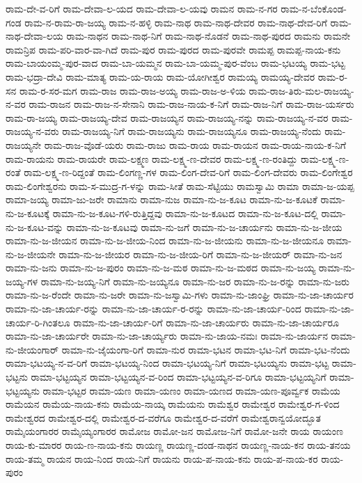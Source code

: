 ರಾಮ-ದೇ-ವ-ರಿಗೆ
ರಾಮ-ದೇವಾ-ಲ-ಯದ
ರಾಮ-ದೇವಾ-ಲ-ಯವು
ರಾಮನ
ರಾಮ-ನ-ಗರ
ರಾಮ-ನ-ಬೆಂಕೊಂಡ-ಗಂಡ
ರಾಮ-ನ-ರಾಮ-ರಾ-ಜಯ್ಯ
ರಾಮ-ನ-ಹಳ್ಳಿ
ರಾಮ-ನಾಥ
ರಾಮ-ನಾಥ-ದೇವರ
ರಾಮ-ನಾಥ-ದೇವ-ರಿಗೆ
ರಾಮ-ನಾಥ-ದೇವಾ-ಲಯ
ರಾಮ-ನಾಥನ
ರಾಮ-ನಾಥ-ನಿಗೆ
ರಾಮ-ನಾಥ-ನೊಡನೆ
ರಾಮ-ನಾಥ-ಪುರದ
ರಾಮನು
ರಾಮನೇ
ರಾಮನ್ರಿಪ
ರಾಮ-ಪರಿ-ವಾರ-ವಾ-ಗಿದೆ
ರಾಮ-ಪುರ
ರಾಮ-ಪುರದ
ರಾಮ-ಪುರವೇ
ರಾಮಪ್ಪ
ರಾಮಪ್ಪ-ನಾಯ-ಕನು
ರಾಮ-ಬಾಯಂಮ್ಮ-ಪುರ-ವಾದ
ರಾಮ-ಬಾ-ಯಮ್ಮನ
ರಾಮ-ಬಾ-ಯಮ್ಮ-ಪುರ-ವೆಂಬ
ರಾಮ-ಭಟಯ್ಯ
ರಾಮ-ಭಟ್ಟ
ರಾಮ-ಭದ್ರಾ-ದೇವಿ
ರಾಮ-ಮಾತ್ಯ
ರಾಮ-ಯ-ರಾಯ
ರಾಮ-ಯೋಗೀಶ್ವರ
ರಾಮಯ್ಯ
ರಾಮಯ್ಯ-ದೇವರ
ರಾಮ-ರ-ಸನ
ರಾಮ-ರ-ಸರ-ಮಗ
ರಾಮ-ರಾಜ
ರಾಮ-ರಾಜ-ಅಯ್ಯ
ರಾಮ-ರಾಜ-ಅ-ಳಿಯ
ರಾಮ-ರಾಜ-ತಿರು-ಮಲ-ರಾಜಯ್ಯ-ನ-ವರ
ರಾಮ-ರಾಜನ
ರಾಮ-ರಾಜ-ನ-ಸೇನಾನಿ
ರಾಮ-ರಾಜ-ನಾಯ-ಕ-ನಿಗೆ
ರಾಮ-ರಾಜ-ನಿಗೆ
ರಾಮ-ರಾಜ-ಯರ್ಸರು
ರಾಮ-ರಾ-ಜಯ್ಯ
ರಾಮ-ರಾಜಯ್ಯ-ದೇವ
ರಾಮ-ರಾಜಯ್ಯನ
ರಾಮ-ರಾಜಯ್ಯ-ನನ್ನು
ರಾಮ-ರಾಜಯ್ಯ-ನ-ವರ
ರಾಮ-ರಾಜಯ್ಯ-ನ-ವರು
ರಾಮ-ರಾಜಯ್ಯ-ನಿಗೆ
ರಾಮ-ರಾಜಯ್ಯನು
ರಾಮ-ರಾಜಯ್ಯನೂ
ರಾಮ-ರಾಜಯ್ಯ-ನೆಂದು
ರಾಮ-ರಾಜಯ್ಯನೇ
ರಾಮ-ರಾಜ-ವೊಡೆ-ಯರು
ರಾಮ-ರಾಜು
ರಾಮ-ರಾಯ
ರಾಮ-ರಾಯನ
ರಾಮ-ರಾಯ-ನಾಯ-ಕ-ನಿಗೆ
ರಾಮ-ರಾಯನು
ರಾಮ-ರಾಯರೇ
ರಾಮ-ಲಕ್ಷ್ಮಣ
ರಾಮ-ಲಕ್ಷ್ಮ-ಣ-ದೇವರ
ರಾಮ-ಲಕ್ಷ್ಮ-ಣ-ರಂತಿದ್ದು
ರಾಮ-ಲಕ್ಷ್ಮ-ಣ-ರಂತೆ
ರಾಮ-ಲಕ್ಷ್ಮ-ಣ-ರಿದ್ದಂತೆ
ರಾಮ-ಲಿಂಗಣ್ಣ-ಗಳ
ರಾಮ-ಲಿಂಗ-ದೇವ-ರಿಗೆ
ರಾಮ-ಲಿಂಗ-ದೇವರು
ರಾಮ-ಲಿಂಗೇಶ್ವರ
ರಾಮ-ಲಿಂಗೇಶ್ವರನು
ರಾಮ-ಸ-ಮುದ್ರ-ಗ-ಳನ್ನು
ರಾಮ-ಸೀತೆ
ರಾಮ-ಸೆಟ್ಟಿಯು
ರಾಮಸ್ವಾಮಿ
ರಾಮಾ
ರಾಮಾ-ಜ-ಯಪ್ಪ
ರಾಮಾ-ಜಯ್ಯ
ರಾಮಾ-ಜು-ಜರೇ
ರಾಮಾನು
ರಾಮಾ-ನುಜ
ರಾಮಾ-ನು-ಜ-ಕೂಟ
ರಾಮಾ-ನು-ಜ-ಕೂಟಕೆ
ರಾಮಾ-ನು-ಜ-ಕೂಟಕ್ಕೆ
ರಾಮಾ-ನು-ಜ-ಕೂಟ-ಗಳಿ-ರುತ್ತಿದ್ದವು
ರಾಮಾ-ನು-ಜ-ಕೂಟದ
ರಾಮಾ-ನು-ಜ-ಕೂಟ-ದಲ್ಲಿ
ರಾಮಾ-ನು-ಜ-ಕೂಟ-ವನ್ನು
ರಾಮಾ-ನು-ಜ-ಕೂಟವು
ರಾಮಾ-ನು-ಜಗೆ
ರಾಮಾ-ನು-ಜ-ಚಾರ್ಯನು
ರಾಮಾ-ನು-ಜ-ಜೀಯ
ರಾಮಾ-ನು-ಜ-ಜೀಯನ
ರಾಮಾ-ನು-ಜ-ಜೀಯ-ನಿಂದ
ರಾಮಾ-ನು-ಜ-ಜೀಯನು
ರಾಮಾ-ನು-ಜ-ಜೀಯನೂ
ರಾಮಾ-ನು-ಜ-ಜೀಯನೇ
ರಾಮಾ-ನು-ಜ-ಜೀಯರ
ರಾಮಾ-ನು-ಜ-ಜೀಯ-ರಿಗೆ
ರಾಮಾ-ನು-ಜ-ಜೀಯರ್
ರಾಮಾ-ನು-ಜನ
ರಾಮಾ-ನು-ಜನು
ರಾಮಾ-ನು-ಜ-ಪುರಂ
ರಾಮಾ-ನು-ಜ-ಮಠ
ರಾಮಾ-ನು-ಜ-ಮಠದ
ರಾಮಾ-ನು-ಜಯ್ಯ
ರಾಮಾ-ನು-ಜಯ್ಯ-ಗಳ
ರಾಮಾ-ನು-ಜಯ್ಯ-ನಿಗೆ
ರಾಮಾ-ನು-ಜಯ್ಯನೂ
ರಾಮಾ-ನು-ಜರ
ರಾಮಾ-ನು-ಜ-ರನ್ನು
ರಾಮಾ-ನು-ಜರು
ರಾಮಾ-ನು-ಜ-ರೆಂದೇ
ರಾಮಾ-ನು-ಜರೇ
ರಾಮಾ-ನು-ಜಸ್ವಾಮಿ-ಗಳು
ರಾಮಾ-ನು-ಜಾಂಘ್ರಿ
ರಾಮಾ-ನು-ಜಾ-ಚಾರ್ಯರ
ರಾಮಾ-ನು-ಜಾ-ಚಾರ್ಯ-ರನ್ನು
ರಾಮಾ-ನು-ಜಾ-ಚಾರ್ಯ-ರ-ರನ್ನು
ರಾಮಾ-ನು-ಜಾ-ಚಾರ್ಯ-ರಿಂದ
ರಾಮಾ-ನು-ಜಾ-ಚಾರ್ಯ-ರಿ-ಗಿಂತಲೂ
ರಾಮಾ-ನು-ಜಾ-ಚಾರ್ಯ-ರಿಗೆ
ರಾಮಾ-ನು-ಜಾ-ಚಾರ್ಯರು
ರಾಮಾ-ನು-ಜಾ-ಚಾರ್ಯರೂ
ರಾಮಾ-ನು-ಜಾ-ಚಾರ್ಯರೇ
ರಾಮಾ-ನು-ಜಾ-ಚಾರ್ಯ್ಯರು
ರಾಮಾ-ನು-ಜಾಯ-ನಮಃ
ರಾಮಾ-ನು-ಜಾರ್ಯನ
ರಾಮಾ-ನು-ಜೀಯಂಗಾರ್
ರಾಮಾ-ನು-ಜೈಯಂಗಾ-ರಿಗೆ
ರಾಮಾ-ನುರ
ರಾಮಾ-ಭಟನ
ರಾಮಾ-ಭಟ-ನಿಗೆ
ರಾಮಾ-ಭಟ-ನೆಂದು
ರಾಮಾ-ಭಟಯ್ಯ-ನ-ವ-ರಿಗೆ
ರಾಮಾ-ಭಟಯ್ಯ-ನಿಂದ
ರಾಮಾ-ಭಟಯ್ಯ-ನಿಗೆ
ರಾಮಾ-ಭಟಯ್ಯನು
ರಾಮಾ-ಭಟ್ಟ
ರಾಮಾ-ಭಟ್ಟನು
ರಾಮಾ-ಭಟ್ಟಯ್ಯನ
ರಾಮಾ-ಭಟ್ಟಯ್ಯನ-ವ-ರಿಂದ
ರಾಮಾ-ಭಟ್ಟಯ್ಯನ-ವ-ರಿಗೂ
ರಾಮಾ-ಭಟ್ಟಯ್ಯನಿಗೆ
ರಾಮಾ-ಭಟ್ಟಯ್ಯನು
ರಾಮಾ-ಭಟ್ಟರ
ರಾಮಾ-ಯಣ
ರಾಮಾ-ಯಣಂ
ರಾಮಾ-ಯಣದ
ರಾಮಾ-ಯಣ-ಪೂರ್ವ್ವಕ
ರಾಮೆಯ
ರಾಮೆಯನ
ರಾಮೆಯ-ನಾಯ-ಕನು
ರಾಮೆಯ-ನಾಯ್ಕ
ರಾಮೆಯನು
ರಾಮೆಶ್ವರ
ರಾಮೇಶ್ವರ
ರಾಮೇಶ್ವರ-ಗ-ಳಿಂದ
ರಾಮೇಶ್ವರದ
ರಾಮೇಶ್ವರ-ದಲ್ಲಿ
ರಾಮೇಶ್ವರ-ದ-ವರೆಗೂ
ರಾಮೇಶ್ವರ-ದ-ವರೆಗೆ
ರಾಮೇಶ್ವರಾನ್ವಯೋದ್ಭೂತ
ರಾಮೈಯಂಗಾರರ
ರಾಮೈಯ್ಯಂಗಾರರ
ರಾಮೋಜ
ರಾಮೋ-ಜನ
ರಾಮೋಜ-ನಿಗೆ
ರಾಮೋ-ಜನೇ
ರಾಯ
ರಾಯಂಣ
ರಾಯ-ಕು-ಮಾರರ
ರಾಯ-ಣ-ನಾಯ-ಕನು
ರಾಯಣ್ಣ
ರಾಯಣ್ಣ-ದಂಡ-ನಾಥನ
ರಾಯಣ್ಣ-ನಾಯ-ಕನ
ರಾಯ-ತನಯ
ರಾಯ-ತಮ್ಮ
ರಾಯನ
ರಾಯ-ನಿಂದ
ರಾಯ-ನಿಗೆ
ರಾಯನು
ರಾಯ-ಪ-ನಾಯ-ಕನು
ರಾಯ-ಪ-ನಾಯ-ಕರ
ರಾಯ-ಪುರಂ

